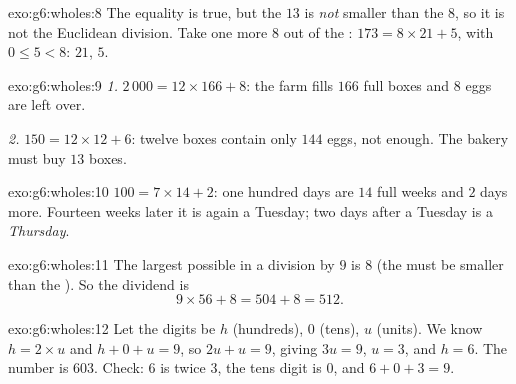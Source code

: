 \begin{solution}{exo:g6:wholes:8}
The equality is true, but the  $13$ is \emph{not} smaller than
the  $8$, so it is not the Euclidean division. Take one more
$8$ out of the : $173 = 8 \times 21 + 5$, with $0 \leq 5 < 8$:
 $21$,  $5$.
\end{solution}

\begin{solution}{exo:g6:wholes:9}
\emph{1.} $2\,000 = 12 \times 166 + 8$: the farm fills $166$ full
boxes and $8$ eggs are left over.

\emph{2.} $150 = 12 \times 12 + 6$: twelve boxes contain only $144$
eggs, not enough. The bakery must buy $13$ boxes.
\end{solution}

\begin{solution}{exo:g6:wholes:10}
$100 = 7 \times 14 + 2$: one hundred days are $14$ full weeks and $2$
days more. Fourteen weeks later it is again a Tuesday; two days after a
Tuesday is a \emph{Thursday}.
\end{solution}

\begin{solution}{exo:g6:wholes:11}
The largest possible  in a division by $9$ is $8$ (the
 must be smaller than the ). So the dividend is
\[
9 \times 56 + 8 = 504 + 8 = 512 .
\]
\end{solution}

\begin{solution}{exo:g6:wholes:12}
Let the digits be $h$ (hundreds), $0$ (tens), $u$ (units). We know
$h = 2 \times u$ and $h + 0 + u = 9$, so $2u + u = 9$, giving
$3u = 9$, $u = 3$, and $h = 6$. The number is $603$. Check: $6$ is
twice $3$, the tens digit is $0$, and $6 + 0 + 3 = 9$.
\end{solution}

